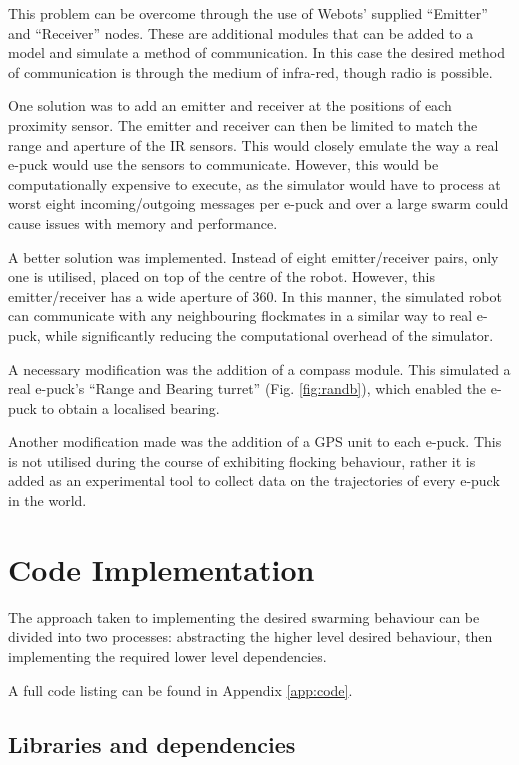 This problem can be overcome through the use of Webots' supplied ``Emitter'' and ``Receiver'' nodes. These are additional modules that can be added to a model and simulate a method of communication. In this case the desired method of communication is through the medium of infra-red, though radio is possible.

One solution was to add an emitter and receiver at the positions of each proximity sensor. The emitter and receiver can then be limited to match the range and aperture of the IR sensors. This would closely emulate the way a real e-puck would use the sensors to communicate. However, this would be computationally expensive to execute, as the simulator would have to process at worst eight incoming/outgoing messages per e-puck and over a large swarm could cause issues with memory and performance.

A better solution was implemented. Instead of eight emitter/receiver pairs, only one is utilised, placed on top of the centre of the robot. However, this emitter/receiver has a wide aperture of 360\textdegree. In this manner, the simulated robot can communicate with any neighbouring flockmates in a similar way to real e-puck, while significantly reducing the computational overhead of the simulator.

A necessary modification was the addition of a compass module. This simulated a real e-puck's ``Range and Bearing turret'' (Fig. \ref{fig:randb}), which enabled the e-puck to obtain a localised bearing.

Another modification made was the addition of a GPS unit to each e-puck. This is not utilised during the course of exhibiting flocking behaviour, rather it is added as an experimental tool to collect data on the trajectories of every e-puck in the world.

\section{Code Implementation}
\label{section:code}

The approach taken to implementing the desired swarming behaviour can be divided into two processes: abstracting the higher level desired behaviour, then implementing the required lower level dependencies.

A full code listing can be found in Appendix \ref{app:code}.

\subsection{Libraries and dependencies}

